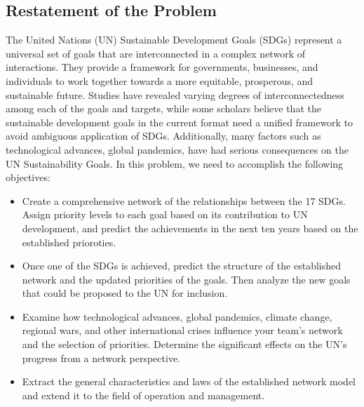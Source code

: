 \documentclass[12pt]{article}  %
\begin{document}
\subsection{Restatement of the Problem}
The United Nations (UN) Sustainable Development Goals (SDGs) represent a universal set of goals that are interconnected in a complex network of
interactions. They provide a framework for governments, businesses, and individuals to work together towards a more equitable, prosperous, and sustainable future. Studies have revealed varying degrees of interconnectedness among each of the goals and targets, while some scholars believe that the sustainable development goals in the current format need a unified framework  to avoid ambiguous application of SDGs. Additionally, many factors such as technological advances, global pandemics, have had serious consequences on the UN Sustainability Goals. In this problem, we need to accomplish the following objectives:

\begin{itemize}
    \item Create a comprehensive network of the relationships between the 17 SDGs.  Assign priority levels to each goal  based on its contribution to UN development, and predict the achievements in the next ten years based on the established prioroties.
    \item Once one of the SDGs is achieved, predict the structure of the established network and the updated priorities of the goals. Then analyze the new goals that could be proposed to the UN for inclusion.
    \item Examine how technological advances, global pandemics, climate change, regional wars, and other international crises influence your team's network and the selection of priorities. Determine the significant effects on the UN's progress from a network perspective.
    \item  Extract the general characteristics and laws of the established network model and extend it to the field of operation and management.
\end{itemize}

\end{document}
